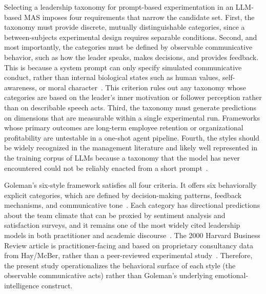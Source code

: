 Selecting a leadership taxonomy for prompt-based experimentation in an \ac{LLM}-based \ac{MAS} imposes four requirements that narrow the candidate set.
First, the taxonomy must provide discrete, mutually distinguishable categories, since a between-subjects experimental design requires separable conditions.
Second, and most importantly, the categories must be defined by observable communicative behavior, such as how the leader speaks, makes decisions, and provides feedback.
This is because a system prompt can only specify simulated communicative conduct, rather than internal biological states such as human values, self-awareness, or moral character~\cite{shanahan2023roleplaylargelanguagemodels}.
This criterion rules out any taxonomy whose categories are based on the leader's inner motivation or follower perception rather than on describable speech acts.
Third, the taxonomy must generate predictions on dimensions that are measurable within a single experimental run.
Frameworks whose primary outcomes are long-term employee retention or organizational profitability are untestable in a one-shot agent pipeline.
Fourth, the styles should be widely recognized in the management literature and likely well represented in the training corpus of \acp{LLM} because a taxonomy that the model has never encountered could not be reliably enacted from a short prompt~\cite{salewski2023incontextimpersonationrevealslarge, serapiogarcia2025personalitytraitslargelanguage, lacava2025openmodelsclosedminds}.

Goleman's six-style framework satisfies all four criteria. 
It offers six behaviorally explicit categories, which are defined by decision-making patterns, feedback mechanisms, and communicative tone~\cite{goleman2000leadership}.
Each category has directional predictions about the team climate that can be proxied by sentiment analysis and satisfaction surveys, and it remains one of the most widely cited leadership models in both practitioner and academic discourse~\cite{goleman2000leadership}.
The 2000 Harvard Business Review article is practitioner-facing and based on proprietary consultancy data from Hay/McBer, rather than a peer-reviewed experimental study~\cite{goleman2000leadership}.
Therefore, the present study operationalizes the behavioral surface of each style (the observable communicative acts) rather than Goleman's underlying emotional-intelligence construct.


